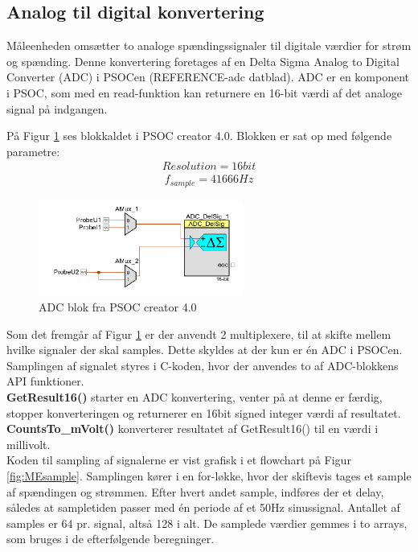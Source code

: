 
\subsection{Analog til digital konvertering}

Måleenheden omsætter to analoge spændingssignaler til digitale værdier for strøm og spænding. Denne konvertering foretages af en Delta Sigma Analog to Digital Converter (ADC) i PSOCen (REFERENCE-adc datblad).  ADC er en komponent i PSOC, som med en read-funktion kan returnere en 16-bit værdi af det analoge signal på indgangen. 

På Figur \ref{fig:MEADC} ses blokkaldet i PSOC creator 4.0. Blokken er sat op med følgende parametre:
\begin{align}
Resolution = 16bit
\end{align}
\begin{align}
f_{sample} = 41666 Hz
\end{align}

\begin{figure}[htbp] %
	\centering
	\includegraphics[width=0.6\textwidth]{Figure/MEADC}
	\caption{ADC blok fra PSOC creator 4.0}
	\label{fig:MEADC}
\end{figure}

Som det fremgår af Figur \ref{fig:MEADC} er der anvendt 2 multiplexere, til at skifte mellem hvilke signaler der skal samples. Dette skyldes at der kun er én ADC i PSOCen. Samplingen af signalet styres i C-koden, hvor der anvendes to af ADC-blokkens API funktioner. 
\\

\textbf{GetResult16() }starter en ADC konvertering, venter på at denne er færdig, stopper konverteringen og returnerer en 16bit signed integer værdi af resultatet. 
\\

\textbf{CountsTo\_mVolt()} konverterer resultatet af GetResult16() til en værdi i millivolt. 
\\

Koden til sampling af signalerne er vist grafisk i et flowchart på Figur \ref{fig:MEsample}. Samplingen kører i en for-løkke, hvor der skiftevis tages et sample af spændingen og strømmen. Efter hvert andet sample, indføres der et delay, således at sampletiden passer med én periode af et 50Hz sinussignal. Antallet af samples er 64 pr. signal, altså 128 i alt. De samplede værdier gemmes i to arrays, som bruges i de efterfølgende beregninger. 


